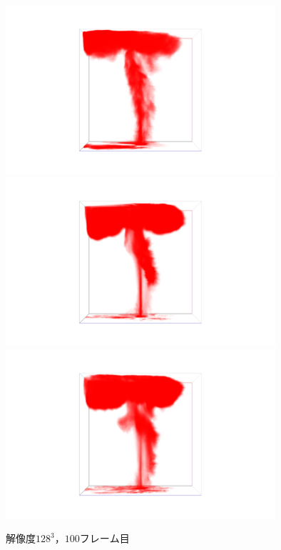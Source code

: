 \documentclass[a4j,12pt]{jreport}
\begin{document}
\begin{figure}[htbp]
\caption{$解像度128^3，100フレーム目$}
\label{fig:n128_f100}
\centering
\includegraphics[width=100mm]{images/n128_f100_truth.png}
\includegraphics[width=100mm]{images/n128_f100_dev1.png}
\includegraphics[width=100mm]{images/n128_f100_dev2.png}
\end{figure}




\end{document}

